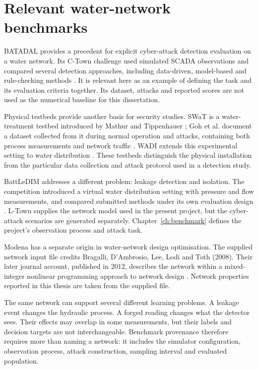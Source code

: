 \section{Relevant water-network benchmarks}
BATADAL provides a precedent for explicit cyber-attack detection evaluation on a water network. Its C-Town challenge used simulated SCADA observations and compared several detection approaches, including data-driven, model-based and rule-checking methods \cite{batadal}. It is relevant here as an example of defining the task and its evaluation criteria together. Its dataset, attacks and reported scores are not used as the numerical baseline for this dissertation.

Physical testbeds provide another basis for security studies. SWaT is a water-treatment testbed introduced by Mathur and Tippenhauer \cite{mathur2016swat}; Goh et al. document a dataset collected from it during normal operation and attacks, containing both process measurements and network traffic \cite{goh2017swatdata}. WADI extends this experimental setting to water distribution \cite{ahmed2017wadi}. These testbeds distinguish the physical installation from the particular data collection and attack protocol used in a detection study.

BattLeDIM addresses a different problem: leakage detection and isolation. The competition introduced a virtual water distribution setting with pressure and flow measurements, and compared submitted methods under its own evaluation design \cite{battledim}. L-Town supplies the network model used in the present project, but the cyber-attack scenarios are generated separately. Chapter~\ref{ch:benchmark} defines the project's observation process and attack task.

Modena has a separate origin in water-network design optimisation. The supplied network input file credits Bragalli, D'Ambrosio, Lee, Lodi and Toth (2008). Their later journal account, published in 2012, describes the network within a mixed-integer nonlinear programming approach to network design \cite{bragalli2012modena}. Network properties reported in this thesis are taken from the supplied file.

The same network can support several different learning problems. A leakage event changes the hydraulic process. A forged reading changes what the detector sees. Their effects may overlap in some measurements, but their labels and decision targets are not interchangeable. Benchmark provenance therefore requires more than naming a network: it includes the simulator configuration, observation process, attack construction, sampling interval and evaluated population.

